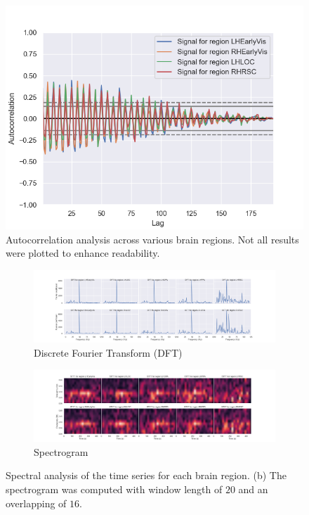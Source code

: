 \begin{figure}
    \centering
    \includegraphics[width=\textwidth, height=0.25\textheight]{img/autocorrelation_TS.png}
    \caption{Autocorrelation analysis across various brain regions. Not all results were plotted to enhance readability.}
    \label{fig:autocorr_TS}
\end{figure}

\begin{figure}
    \centering
    \begin{subfigure}{\textwidth}
        \centering
        \includegraphics[width=\textwidth, height=0.28\textheight]{img/DFT_TS.png}
        \caption{Discrete Fourier Transform (DFT)}
    \end{subfigure}
    \begin{subfigure}{\textwidth}
        \centering
        \includegraphics[width=\textwidth, height=0.25\textheight]{img/spectrogram_TS.png}
        \caption{Spectrogram}
        \label{spectrogram_TS}
    \end{subfigure}
    \caption{Spectral analysis of the time series for each brain region. (b) The spectrogram was computed with window length of $20$ and an overlapping of $16$.}
    \label{fig:spectral_TS}
\end{figure}

